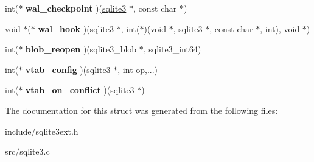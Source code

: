 \begin{DoxyCompactItemize}
\item 
\hypertarget{structsqlite3__api__routines_a8161479d3298a910a21e9d6dd92e1083}{int($\ast$ {\bfseries wal\-\_\-checkpoint} )(\hyperlink{structsqlite3}{sqlite3} $\ast$, const char $\ast$)}\label{structsqlite3__api__routines_a8161479d3298a910a21e9d6dd92e1083}

\item 
\hypertarget{structsqlite3__api__routines_a967b53588e948815d36d870de8da8c60}{void $\ast$($\ast$ {\bfseries wal\-\_\-hook} )(\hyperlink{structsqlite3}{sqlite3} $\ast$, int($\ast$)(void $\ast$, \hyperlink{structsqlite3}{sqlite3} $\ast$, const char $\ast$, int), void $\ast$)}\label{structsqlite3__api__routines_a967b53588e948815d36d870de8da8c60}

\item 
\hypertarget{structsqlite3__api__routines_aa908e25dd18c6a891a767eec620484e5}{int($\ast$ {\bfseries blob\-\_\-reopen} )(sqlite3\-\_\-blob $\ast$, sqlite3\-\_\-int64)}\label{structsqlite3__api__routines_aa908e25dd18c6a891a767eec620484e5}

\item 
\hypertarget{structsqlite3__api__routines_a9670fe7124c3bd00b32354933c15313f}{int($\ast$ {\bfseries vtab\-\_\-config} )(\hyperlink{structsqlite3}{sqlite3} $\ast$, int op,...)}\label{structsqlite3__api__routines_a9670fe7124c3bd00b32354933c15313f}

\item 
\hypertarget{structsqlite3__api__routines_ae153b85e12e894c0bfb433c13c2690d7}{int($\ast$ {\bfseries vtab\-\_\-on\-\_\-conflict} )(\hyperlink{structsqlite3}{sqlite3} $\ast$)}\label{structsqlite3__api__routines_ae153b85e12e894c0bfb433c13c2690d7}

\end{DoxyCompactItemize}


The documentation for this struct was generated from the following files\-:\begin{DoxyCompactItemize}
\item 
include/sqlite3ext.\-h\item 
src/sqlite3.\-c\end{DoxyCompactItemize}
